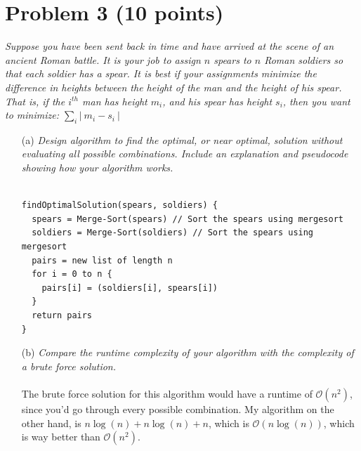\documentclass[12pt]{article}
\begin{document}
{%
\section*{{\selectfont Problem 3 (10 points)}}\vspace{-10mm}
\textsl{Suppose you have been sent back in time and have arrived at the scene of an ancient Roman battle. It is your job to assign $n$ spears to $n$ Roman soldiers so that each soldier has a spear. It is best if your assignments minimize the difference in heights between the height of the man and the height of his spear. That is, if the $i^{th}$ man has height $m_i$, and his spear has height $s_i$, then you want to minimize: $\sum_{i} \left| ~ m_i - s_i ~ \right|$}
\begin{enumerate}
\item[(a)]\textsl{Design algorithm to find the optimal, or near optimal, solution without evaluating all possible combinations. Include an explanation and pseudocode showing how your algorithm works.}\\ \\
\begin{lstlisting}
findOptimalSolution(spears, soldiers) {
  spears = Merge-Sort(spears) // Sort the spears using mergesort
  soldiers = Merge-Sort(soldiers) // Sort the spears using mergesort
  pairs = new list of length n
  for i = 0 to n {
    pairs[i] = (soldiers[i], spears[i])
  }
  return pairs
}
\end{lstlisting}
\item[(b)]\textsl{Compare the runtime complexity of your algorithm with the complexity of a brute force solution.}\\ \\
The brute force solution for this algorithm would have a runtime of $\mathcal{O}(n^2)$, since you'd go through every possible combination. My algorithm on the other hand, is $n\log(n) + n\log(n) + n$, which is $\mathcal{O}(n\log(n))$, which is way better than $\mathcal{O}(n^2)$.
\end{enumerate}

}
\end{document}
